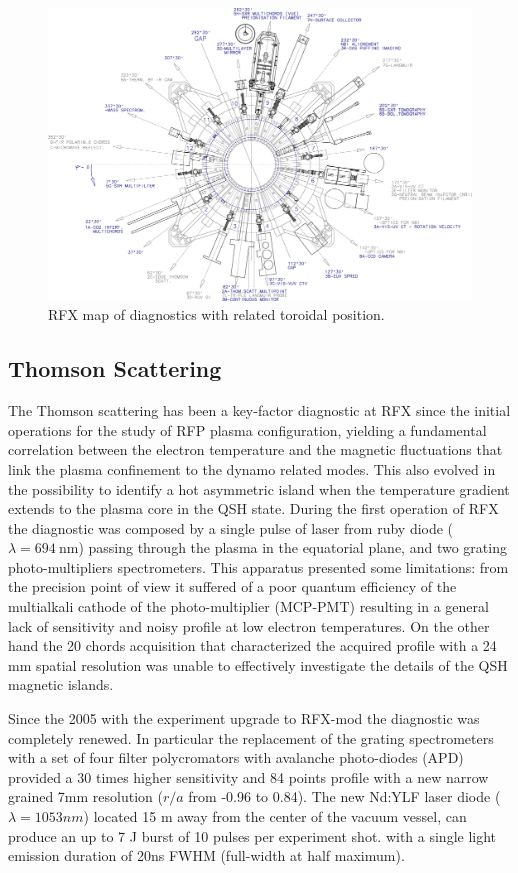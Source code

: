 %
\begin{figure}[ht!]
\includegraphics[width=1\textwidth]{img/rfx/Layout_Diagnosiche_AA10005.eps} \centering
\caption{RFX map of diagnostics with related toroidal position.}
\label{rfx}
\end{figure}
%

\subsection{Thomson Scattering}
The Thomson scattering  has been a key-factor diagnostic at RFX since the initial operations for the study of RFP plasma configuration, yielding a fundamental correlation between the electron temperature and the magnetic fluctuations that link the plasma confinement to the dynamo related modes. This also evolved in the possibility to identify a hot asymmetric island when the temperature gradient extends to the plasma core in the \ac{QSH} state.
During the first operation of RFX the diagnostic was composed by a single pulse of laser from ruby diode ($\lambda=694~\text{nm}$) passing through the plasma in the equatorial plane, and two grating photo-multipliers spectrometers.
This apparatus presented some limitations: from the precision point of view it suffered of a poor quantum efficiency of the multialkali cathode of the photo-multiplier (MCP-PMT) resulting in a general lack of sensitivity and noisy profile at low electron temperatures. On the other hand the 20 chords acquisition that characterized the acquired profile with a 24 mm spatial resolution was unable to effectively investigate the details of the QSH magnetic islands.

Since the 2005 with the experiment upgrade to RFX-mod the diagnostic was completely renewed. In particular the replacement of the grating spectrometers with a set of four filter polycromators with avalanche photo-diodes (APD) provided a 30 times higher sensitivity and 84 points profile with a new narrow grained 7mm resolution ($r/a$ from -0.96 to 0.84).
The new Nd:YLF laser diode ($\lambda=1053 nm$) located 15 m away from the center of the vacuum vessel, can produce an up to 7 J burst of 10 pulses per experiment shot. with a single light emission duration of 20ns FWHM (full-width at half maximum).

